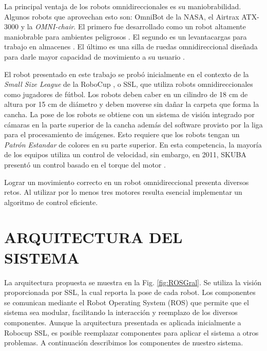 \documentclass[twocolumn,10pt]{amrob}
\newcommand{\TODO}[1]{{\color{red}{TODO: {#1}}}}
\begin{document}
La principal ventaja de los robots omnidireccionales es su maniobrabilidad. Algunos robots que aprovechan esto son: OmniBot de la NASA, el Airtrax ATX-3000 y la \textit{OMNI-chair}. El primero fue desarrollado como un robot altamente maniobrable para ambientes peligrosos \cite{houshangi1999omnibot}. El segundo es un levantacargas para trabajo en almacenes \cite{aduascualictei2011practical}. El último es una silla de ruedas omnidireccional diseñada para darle mayor capacidad de movimiento a su usuario \cite{borgolte1998architectural}.

El robot presentado en este trabajo se probó inicialmente en el contexto de la \emph{Small Size League} de la RoboCup \cite{sslWiki}, o SSL, que utiliza robots omnidireccionales como jugadores de fútbol. Los robots deben caber en un cilindro de 18 cm de altura por 15 cm de diámetro y deben moverse sin dañar la carpeta que forma la cancha. La pose de los robots se obtiene con un sistema de visión integrado por cámaras en la parte superior de la cancha además del software provisto por la liga para el procesamiento de imágenes. Esto requiere que los robots tengan un \textit{Patrón Estandar} de colores en su parte superior. En esta competencia, la mayoría de los equipos utiliza un control de velocidad, sin embargo, en 2011, SKUBA presentó un control basado en el torque del motor \cite{chaisoskuba}. 

Lograr un movimiento correcto en un robot omnidireccional presenta diversos retos. Al utilizar por lo menos tres motores resulta esencial implementar un algoritmo de control eficiente. \TODO{MM: podrías mencionar un par de retos mas?}


\section*{ARQUITECTURA DEL SISTEMA}

La arquitectura propuesta se muestra en la Fig. \ref{fig:ROSGral}. Se utiliza la visión proporcionada por SSL, la cual reporta la pose de cada robot. Los componentes se comunican mediante el Robot Operating System (ROS) que permite que el sistema sea modular, facilitando la interacción y reemplazo de los diversos componentes. Aunque la arquitectura presentada es aplicada inicialmente a Robocup SSL, es posible reemplazar componentes para aplicar el sistema a otros problemas. A continuación describimos los componentes de nuestro sistema.
\end{document}
